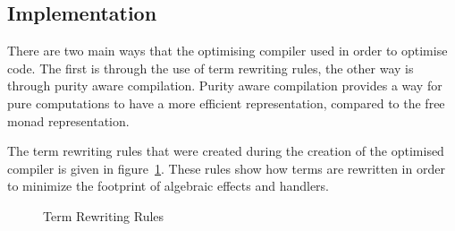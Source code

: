 \subsection{Implementation}
There are two main ways that the optimising compiler used in order to optimise \eff code. The first is through the use of term rewriting rules, the other way is through purity aware compilation. Purity aware compilation provides a way for pure computations to have a more efficient representation, compared to the free monad representation. 

The term rewriting rules that were created during the creation of the optimised compiler is given in figure~\ref{fig:rewriterules}. These rules show how terms are rewritten in order to minimize the footprint of algebraic effects and handlers.

\begin{figure}
\begin{center}
\end{center}

\caption{Term Rewriting Rules \cite{optimization}}\label{fig:rewriterules}
\end{figure}

